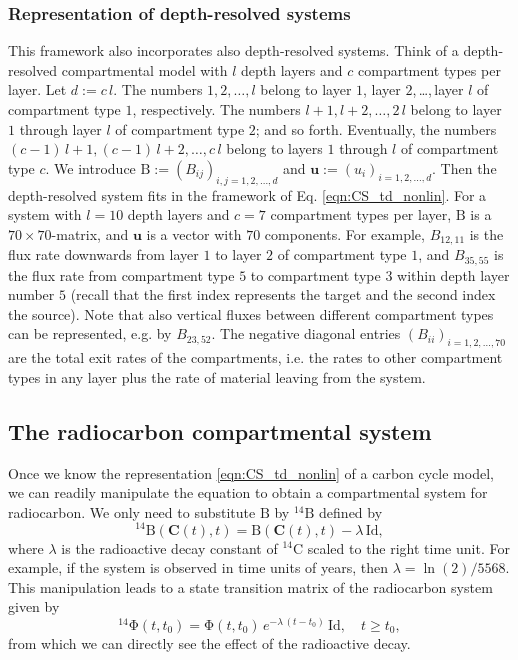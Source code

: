 \documentclass[11pt,a4paper]{article}
\newcommand{\red}[1]{\textcolor{red}{#1}}
\renewcommand{\vec}[1]{\mathbf{#1}}
\newcommand{\tens}[1]{\mathrm{#1}}
\newcommand{\id}{\tens{Id}}
\begin{document}
    
    \subsubsection*{Representation of depth-resolved systems}
    This framework also incorporates also depth-resolved systems.
    Think of a depth-resolved compartmental model with $l$ depth layers and $c$ compartment types per layer.
    Let $d:=c\,l$.
    The numbers $1,2,\ldots,l$ belong to layer $1$, layer $2$,\,\ldots,\,layer $l$ of compartment type $1$, respectively.
    The numbers $l+1,l+2,\ldots,2\,l$ belong to layer $1$ through layer $l$ of compartment type $2$; and so forth.
    Eventually, the numbers $(c-1)\,l+1,(c-1)\,l+2,\ldots,c\,l$ belong to layers $1$ through $l$ of compartment type $c$.
    We introduce $\tens{B}:=(B_{ij})_{i,j=1,2,\ldots,d}$ and $\vec{u}:=(u_i)_{i=1,2,\ldots,d}$.
    Then the depth-resolved system fits in the framework of Eq. \eqref{eqn:CS_td_nonlin}.
    For a system with $l=10$ depth layers and $c=7$ compartment types per layer, $\tens{B}$ is a $70\times 70$-matrix, and $\vec{u}$ is a vector with $70$ components.
    For example, $B_{12,11}$ is the flux rate downwards from layer $1$ to layer $2$ of compartment type $1$, and $B_{35,55}$ is the flux rate from compartment type $5$ to compartment type $3$ within depth layer number $5$ (recall that the first index represents the target and the second index the source).
    Note that also vertical fluxes between different compartment types can be represented, e.g. by $B_{23,52}$.
    The negative diagonal entries $(B_{ii})_{i=1,2,\ldots,70}$ are the total exit rates of the compartments, i.e. the rates to other compartment types in any layer plus the rate of material leaving from the system.
    

\subsection{The radiocarbon compartmental system}
    Once we know the representation \eqref{eqn:CS_td_nonlin} of a carbon cycle model, we can readily manipulate the equation to obtain a compartmental system for radiocarbon.
    We only need to substitute $\tens{B}$ by ${}^{14}\tens{B}$ defined by
    \begin{equation*}
        {}^{14}\tens{B}(\vec{C}(t),t) = \tens{B}(\vec{C}(t),t) - \lambda\,\id,
    \end{equation*}
    where $\lambda$ is the radioactive decay constant of ${}^{14}$C scaled to the right time unit.
    For example, if the system is observed in time units of years, then $\lambda=\ln(2)/5568$.
    This manipulation leads to a state transition matrix of the radiocarbon system given by
    \begin{equation*}
        {}^{14}\tens{\Phi}(t,t_0) = \tens{\Phi}(t,t_0)\, e^{-\lambda\,(t-t_0)}\,\id, \quad t\geq t_0,
    \end{equation*}
    from which we can directly see the effect of the radioactive decay.
\end{document}
